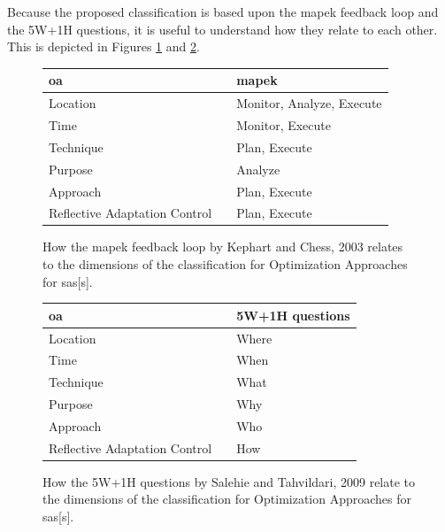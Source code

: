\noindent Because the proposed classification is based upon the \acrshort{mapek} feedback loop and the 5W+1H questions,
it is useful to understand how they relate to each other.
This is depicted in Figures \ref{fig:MapeOA} and \ref{fig:QuestionsOA}.

\begin{figure}[h]
    \centering
    \begin{tabular}{|lcl|}
        \hline
        \acrlong{oa} & & \acrshort{mapek} \\
        \hline
        Location & & Monitor, Analyze, Execute \\
        \hline
        Time & & Monitor, Execute \\
        \hline
        Technique & & Plan, Execute \\
        \hline
        Purpose & & Analyze \\
        \hline
        Approach & & Plan, Execute \\
        \hline
        Reflective Adaptation Control & & Plan, Execute \\
        \hline
    \end{tabular}
    \caption{How the \acrshort{mapek} feedback loop by Kephart and Chess, 2003\cite*{VisionOfAutonomicComputing}
    relates to the dimensions of the classification for Optimization Approaches for \acrlong{sas}[s].}
    \label{fig:MapeOA}
\end{figure}

\begin{figure}[h]
    \centering
    \begin{tabular}{|lcl|}
        \hline
        \acrlong{oa} & & 5W+1H questions \\
        \hline
        Location & & Where \\
        \hline
        Time & & When \\
        \hline
        Technique & & What \\
        \hline
        Purpose & & Why \\
        \hline
        Approach & & Who \\
        \hline
        Reflective Adaptation Control & & How \\
        \hline
    \end{tabular}
    \caption{How the 5W+1H questions by Salehie and Tahvildari, 2009 \cite*{LandscapeAndResearchChallenges}
    relate to the dimensions of the classification for Optimization Approaches for \acrlong{sas}[s].}
    \label{fig:QuestionsOA}
\end{figure}

